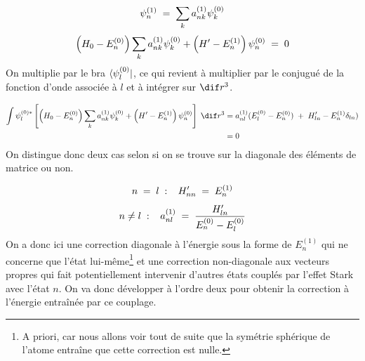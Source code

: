 \[
    \psi_n^{(1)} \; = \; \sum_k a_{nk}^{(1)} \psi_k^{(0)}
\]
\[
    \left(H_0 - E^{(0)}_n\right)\sum_k a_{nk}^{(1)} \psi_k^{(0)} + \left(H' - E^{(1)}_n\right)\psi_n^{(0)} \; = \; 0
\]
On multiplie par le bra $\bra{\psi^{(0)}_l}$, ce qui revient à multiplier par le conjugué de la fonction d'onde associée à $l$ et à intégrer sur $\dif r^3$.

\begin{align*}
    \int \psi^{(0)*}_l\left[ \left(H_0 - E^{(0)}_n\right)\sum_k a_{nk}^{(1)} \psi_k^{(0)} + \left(H' - E^{(1)}_n\right)\psi_n^{(0)}\right] \;\dif r^3 &= a^{(1)}_{nl}(E^{(0)}_l-E^{(0)}_n) \;+\; H'_{ln} - E^{(1)}_n\delta_{ln})\\
    &= 0
\end{align*}
On distingue donc deux cas selon si on se trouve sur la diagonale des éléments de matrice ou non.

\[
    n \; = \;  l\;:\;\;\; H'_{nn} \; = \; E^{(1)}_n
\]
\[
    n \neq l\;:\;\;\; a^{(1)}_{nl} \; = \; \dfrac{H'_{ln}}{E^{(0)}_n-E^{(0)}_l}
\]
On a donc ici une correction diagonale à l'énergie sous la forme de $E^{(1)}_n$ qui ne concerne que l'état lui-même\footnote{A priori, car nous allons voir tout de suite que la symétrie sphérique de l'atome entraîne que cette correction est nulle.} et une correction non-diagonale aux vecteurs propres qui fait potentiellement intervenir d'autres états couplés par l'effet Stark avec l'état $n$. On va donc développer à l'ordre deux pour obtenir la correction à l'énergie entraînée par ce couplage.


